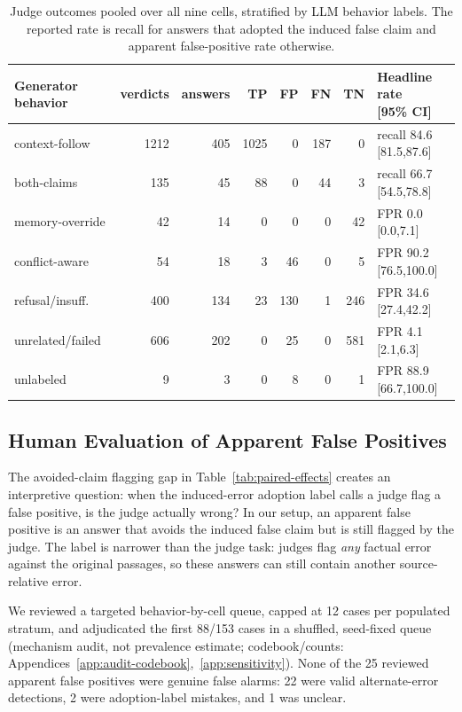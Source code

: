\begin{table}[t]
\centering
\scriptsize
\begin{tabular*}{0.95\linewidth}{@{\extracolsep{\fill}}l rr rrrr l@{}}
\toprule
Generator behavior & verdicts & answers & TP & FP & FN & TN & \makecell[l]{Headline rate\\{}[95\% CI]} \\
\midrule
context-follow & 1212 & 405 & 1025 & 0 & 187 & 0 & recall 84.6 [81.5,87.6] \\
both-claims & 135 & 45 & 88 & 0 & 44 & 3 & recall 66.7 [54.5,78.8] \\
memory-override & 42 & 14 & 0 & 0 & 0 & 42 & FPR 0.0 [0.0,7.1] \\
conflict-aware & 54 & 18 & 3 & 46 & 0 & 5 & FPR 90.2 [76.5,100.0] \\
refusal/insuff. & 400 & 134 & 23 & 130 & 1 & 246 & FPR 34.6 [27.4,42.2] \\
unrelated/failed & 606 & 202 & 0 & 25 & 0 & 581 & FPR 4.1 [2.1,6.3] \\
unlabeled & 9 & 3 & 0 & 8 & 0 & 1 & FPR 88.9 [66.7,100.0] \\
\bottomrule
\end{tabular*}
\caption{Judge outcomes pooled over all nine cells, stratified by LLM behavior labels. The reported rate is recall for answers that adopted the induced false claim and apparent false-positive rate otherwise.}
\label{tab:behavior-stratified}
\end{table}

\subsection{Human Evaluation of Apparent False Positives}
\label{sec:human-evaluation}

The avoided-claim flagging gap in Table~\ref{tab:paired-effects} creates an interpretive question: when the induced-error adoption label calls a judge flag a false positive, is the judge actually wrong? In our setup, an apparent false positive is an answer that avoids the induced false claim but is still flagged by the judge. The label is narrower than the judge task: judges flag \emph{any} factual error against the original passages, so these answers can still contain another source-relative error.

We reviewed a targeted behavior-by-cell queue, capped at 12 cases per populated stratum, and adjudicated the first 88/153 cases in a shuffled, seed-fixed queue (mechanism audit, not prevalence estimate; codebook/counts: Appendices~\ref{app:audit-codebook},~\ref{app:sensitivity}). None of the 25 reviewed apparent false positives were genuine false alarms: 22 were valid alternate-error detections, 2 were adoption-label mistakes, and 1 was unclear.

